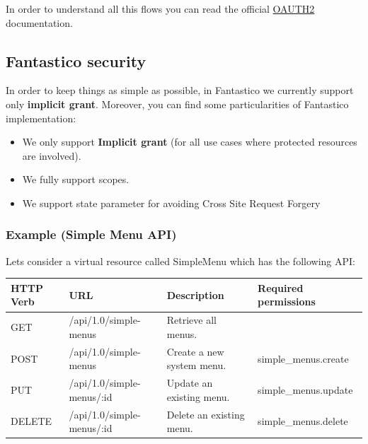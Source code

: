 \documentclass[letterpaper,10pt,english]{sphinxmanual}
\begin{document}
In order to understand all this flows you can read the official \href{http://tools.ietf.org/pdf/rfc6749.pdf}{OAUTH2}
documentation.


\subsection{Fantastico security}
\label{features/oauth2:fantastico-security}
In order to keep things as simple as possible, in Fantastico we currently support only \textbf{implicit grant}. Moreover,
you can find some particularities of Fantastico implementation:
\begin{itemize}
\item {} 
We only support \textbf{Implicit grant} (for all use cases where protected resources are involved).

\item {} 
We fully support scopes.

\item {} 
We support state parameter for avoiding Cross Site Request Forgery

\end{itemize}


\subsubsection{Example (Simple Menu API)}
\label{features/oauth2/simple_api_example::doc}\label{features/oauth2/simple_api_example:example-simple-menu-api}
Lets consider a virtual resource called SimpleMenu which has the following API:

\begin{tabulary}{\linewidth}{|L|L|L|L|}
\hline

\textbf{HTTP Verb}
 & 
\textbf{URL}
 & 
\textbf{Description}
 & 
\textbf{Required permissions}
\\\hline

GET
 & 
/api/1.0/simple-menus
 & 
Retrieve all menus.
 & \\\hline

POST
 & 
/api/1.0/simple-menus
 & 
Create a new system menu.
 & 
simple\_menus.create
\\\hline

PUT
 & 
/api/1.0/simple-menus/:id
 & 
Update an existing menu.
 & 
simple\_menus.update
\\\hline

DELETE
 & 
/api/1.0/simple-menus/:id
 & 
Delete an existing menu.
 & 
simple\_menus.delete
\\\hline
\end{tabulary}
\end{document}
